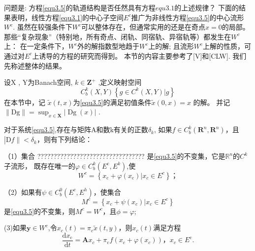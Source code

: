 问题是:
方程\ref{equ3.5}的轨道结构是否任然具有方程\(equ3.1\)的上述规律？
下面的结果表明，线性方程\ref{equ3.1}的中心子空间\(E^c\)推广为非线性方程\ref{equ3.5}的中心流形\(W^c\).
虽然在较强条件下\(W^c\)可以整体存在，但通常实用的还是在奇点\(x=0\)的局部。
那些“复杂现象”（特别地，所有奇点、闭轨、同宿轨、异宿轨等）都发生在\(W^c\)上：
在一定条件下，\(W^c\)外的解指数型地趋于\(W^c\)上的解;
且流形\(W^c\)上解的性质，可通过对\(E^c\)上诱导的方程的研究而得到。
本节的内容主要参考了[V]和[CLW].
我们先称述整体的结果。
\begin{defination}
	设X , Y为Banach空间, $ k \in \mathbf { Z } ^ { + }$ ,定义映射空间
	\begin{equation*}
		C_ { b } ^ { k } ( X , Y )
		\left\{ g \in C ^ { k } ( X , Y )|g%
		\right\}
	\end{equation*}
	在本节中，记 $\tilde { x } ( t , x )$为\ref{equ3.5}的满足初值条件$\tilde { x } ( 0 , x ) = x$ 的解。
	并记 $\| \mathrm { Dg } \| = \sup _ { x \in \mathbf { X } } | \operatorname { Dg } ( x ) |$ .
\end{defination}

\begin{theorem}[全局中心流形定理]
	对于系统\ref{equ3.5},存在与矩阵A和数k有关的正数\(\delta_k\),
	如果$f \in C _ { b } ^ { k } \left( \mathbf { R } ^ { n } , \mathbf { R } ^ { n } \right)$，且$\left| \mathrm { D } f \left\| < \delta _ { k }\right. \right.$，则有下列结论：
	
	
	（1）集合
	?????????????????????????????????
	是\ref{equ3.5}的不变集，它是\(\mathbb{R}^n\)的\(C^k\)子流形，
	既存在唯一的\(\varphi \in C _ { b } ^ { k } \left( E ^ { \mathrm { c } } , E ^ { k } \right)\),使
	\begin{equation}
		W ^ { c } = \left\{ x _ { \mathrm { c } } + \varphi \left( x _ { \mathrm { c } } \right) | x _ { c } \in E ^ { c } \right \}；
		\label{eq:1.3.7}
	\end{equation}
	
	
	（2）如果有$\psi \in C _ { b } ^ {  0 } \left( E ^ { c } , E ^ { h } \right)$，使集合
	\[
		M ^ { c } = \left\{ x _ { c } + \psi \left( x _ { c } \right) | x _ { c } \in E ^ { c } \right\}
	\]
	是\ref{equ3.5}的不变集，则$M ^ { c } = W ^ { c }$，且$\phi = \varphi$;
	
	
	(3)如果$\boldsymbol { y } \in W ^ { c }$,令$x _ { c } ( t ) = \pi _ { c } \widetilde { x } ( t , y )$，则$x _ { c } ( t )$满足方程
	\begin{equation}
		\frac { \mathrm { d } x _ { \mathrm { c } } } { \mathrm { d } t } = \mathbf { A } x _ { c } + \pi _ { \mathrm { c } } f \left( x _ { c } + \varphi \left( x _ { c } \right) \right)，
		x _ { c } \in E ^ { \mathrm { c } }.
		\label{eq:1.3.8}
	\end{equation}
	\label{thm1.3.2}
\end{theorem}

